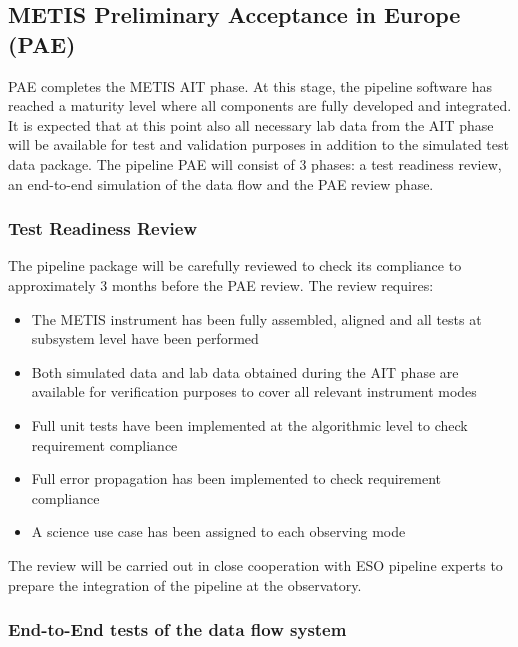 \subsection{METIS Preliminary Acceptance in Europe (PAE)}
\label{ssec:pae_europe}

PAE completes the METIS AIT phase. At this stage, the pipeline software has reached a maturity level where all components are fully developed and integrated. It is expected that at this point also all necessary lab data from the AIT phase will be available for test and validation purposes in addition to the simulated test data package. The pipeline PAE will consist of 3 phases: a test readiness review, an end-to-end simulation of the data flow and the PAE review phase.

\subsubsection{Test Readiness Review}
\label{sssec:trr}

The pipeline package will be carefully reviewed to check its compliance to \cite{1618} approximately 3 months before the PAE review. The review requires:
\begin{itemize}
    \item The METIS instrument has been fully assembled, aligned and all tests at subsystem level have been performed
    \item Both simulated data and lab data obtained during the AIT phase are available for verification purposes to cover all relevant instrument modes
    \item Full unit tests have been implemented at the algorithmic level to check requirement compliance
    \item Full error propagation has been implemented to check requirement compliance
    \item A science use case has been assigned to each observing mode
\end{itemize}
The review will be carried out in close cooperation with ESO pipeline experts to prepare the integration of the pipeline at the observatory.

\subsubsection{End-to-End tests of the data flow system}
\label{sssec:e2e}

